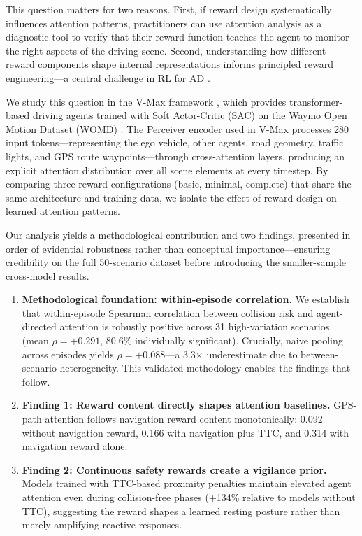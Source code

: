 \documentclass[10pt]{article} %
\begin{document}
This question matters for two reasons. First, if reward design systematically influences attention patterns, practitioners can use attention analysis as a diagnostic tool to verify that their reward function teaches the agent to monitor the right aspects of the driving scene. Second, understanding how different reward components shape internal representations informs principled reward engineering---a central challenge in RL for AD \citep{kiran2022deep}.

We study this question in the V-Max framework \citep{charraut2025vmax}, which provides transformer-based driving agents trained with Soft Actor-Critic (SAC) \citep{haarnoja2018sac} on the Waymo Open Motion Dataset (WOMD) \citep{ettinger2021womd}. The Perceiver encoder \citep{jaegle2021perceiver} used in V-Max processes 280 input tokens---representing the ego vehicle, other agents, road geometry, traffic lights, and GPS route waypoints---through cross-attention layers, producing an explicit attention distribution over all scene elements at every timestep. By comparing three reward configurations (basic, minimal, complete) that share the same architecture and training data, we isolate the effect of reward design on learned attention patterns.

Our analysis yields a methodological contribution and two findings, presented in order of evidential robustness rather than conceptual importance---ensuring credibility on the full 50-scenario dataset before introducing the smaller-sample cross-model results.

\begin{enumerate}[leftmargin=*]
    \item \textbf{Methodological foundation: within-episode correlation.} We establish that within-episode Spearman correlation between collision risk and agent-directed attention is robustly positive across 31 high-variation scenarios (mean $\rho{=}+0.291$, 80.6\% individually significant). Crucially, naive pooling across episodes yields $\rho{=}+0.088$---a 3.3$\times$ underestimate due to between-scenario heterogeneity. This validated methodology enables the findings that follow.
    
    \item \textbf{Finding 1: Reward content directly shapes attention baselines.} GPS-path attention follows navigation reward content monotonically: 0.092 without navigation reward, 0.166 with navigation plus TTC, and 0.314 with navigation reward alone.
    
    \item \textbf{Finding 2: Continuous safety rewards create a vigilance prior.} Models trained with TTC-based proximity penalties maintain elevated agent attention even during collision-free phases (+134\% relative to models without TTC), suggesting the reward shapes a learned resting posture rather than merely amplifying reactive responses.
\end{enumerate}
\end{document}
